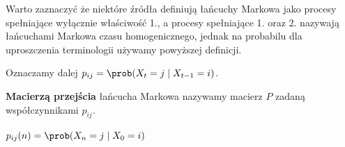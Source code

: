Warto zaznaczyć że niektóre źródła definiują łańcuchy Markowa jako procesy spełniające wyłącznie właściwość 1., a procesy spełniające 1. oraz 2. nazywają łańcuchami Markowa czasu homogenicznego, jednak na probabilu dla uproszczenia terminologii używamy powyższej definicji.

\begin{definition}
	Oznaczamy dalej \(p_{ij} = \prob(X_t = j \mid X_{t-1} = i)\).
\end{definition}

\begin{definition}
	\textbf{Macierzą przejścia} łańcucha Markowa nazywamy macierz \(P\) zadaną współczynnikami \(p_{ij}\).
\end{definition}

\begin{definition}
	\(p_{ij}(n) = \prob(X_n = j \mid X_0 = i)\) \\
\end{definition}
